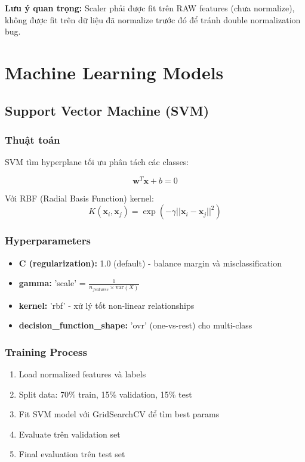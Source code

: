 \textbf{Lưu ý quan trọng:} Scaler phải được fit trên RAW features (chưa normalize), không được fit trên dữ liệu đã normalize trước đó để tránh double normalization bug.

\section{Machine Learning Models}
\label{sec:ml-models}

\subsection{Support Vector Machine (SVM)}
\subsubsection{Thuật toán}
SVM tìm hyperplane tối ưu phân tách các classes:

\begin{equation}
\mathbf{w}^T\mathbf{x} + b = 0
\end{equation}

Với RBF (Radial Basis Function) kernel:
\begin{equation}
K(\mathbf{x}_i, \mathbf{x}_j) = \exp(-\gamma ||\mathbf{x}_i - \mathbf{x}_j||^2)
\end{equation}

\subsubsection{Hyperparameters}
\begin{itemize}
    \item \textbf{C (regularization):} 1.0 (default) - balance margin và misclassification
    \item \textbf{gamma:} 'scale' = $\frac{1}{n_{features} \times \text{var}(X)}$
    \item \textbf{kernel:} 'rbf' - xử lý tốt non-linear relationships
    \item \textbf{decision\_function\_shape:} 'ovr' (one-vs-rest) cho multi-class
\end{itemize}

\subsubsection{Training Process}
\begin{enumerate}
    \item Load normalized features và labels
    \item Split data: 70\% train, 15\% validation, 15\% test
    \item Fit SVM model với GridSearchCV để tìm best params
    \item Evaluate trên validation set
    \item Final evaluation trên test set
\end{enumerate}

